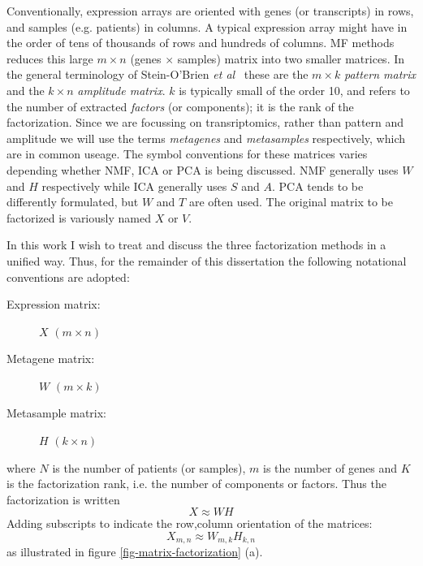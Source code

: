 \documentclass[tikz, 12pt,a4paper,oneside,fleqn]{article}
\newcommand{\etal}{{\em et al\/}}
\begin{document}


Conventionally, expression arrays are oriented with genes (or transcripts) in rows, and samples (e.g. patients) in columns.   
A typical expression array might have in the order of tens of thousands of rows and hundreds of columns.  
MF methods reduces this large $m \times n$ (genes $\times$ samples) matrix into two smaller matrices.
In the general terminology of Stein-O'Brien \etal\ \cite{Stein-OBrien2018} these are the $m \times k$ \emph{pattern matrix} and the $k \times n$ \emph{amplitude matrix}.  $k$ is typically small of the order 10, and refers to the number of extracted \emph{factors} (or components); it is the rank of the factorization.
Since we are focussing on transriptomics, rather than pattern and amplitude we will use the terms \emph{metagenes} and \emph{metasamples} respectively, which are in common useage.  The symbol conventions for these matrices varies depending whether NMF, ICA or PCA is being discussed.   NMF generally uses $W$ and $H$ respectively while ICA generally uses $S$ and $A$.  PCA tends to be differently formulated, but $W$ and $T$ are often used.   The original matrix to be factorized is variously named $X$ or $V$.

In this work I wish to treat and discuss the three factorization methods in a unified way.  Thus, for the remainder of this dissertation the following notational conventions are adopted:
\begin{description}
\item[Expression matrix:] $X$ $(m \times n)$
\item[Metagene matrix:] $W$ $(m \times k)$
\item[Metasample matrix:] $H$ $(k \times n)$
\end{description}
where $N$ is the number of patients (or samples), $m$ is the number of genes and $K$ is the factorization rank, i.e. the number of components or factors.  Thus the factorization is written
\begin{equation}
X \approx W H
\end{equation}
Adding subscripts to indicate the row,column orientation of the matrices:
\begin{equation}
X_{m,n} \approx W_{m,k} H_{k,n}
\end{equation}
as illustrated in figure \ref{fig-matrix-factorization} (a).
\end{document}
